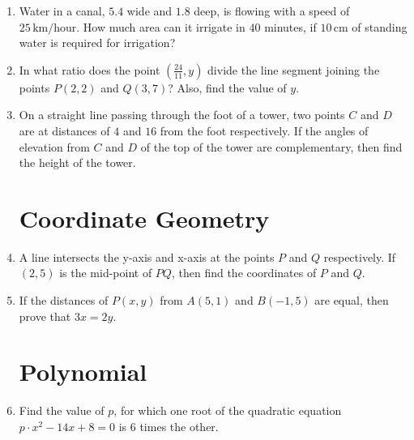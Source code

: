 \documentclass[12pt, letterpaper]{article}
\begin{document}
\begin{enumerate}
    \item Water in a canal, $5.4$ wide and $1.8$ deep, is flowing with a speed of $25\,\text{km/hour}$. How much area can it irrigate in $40$ minutes, if $10\,\text{cm}$ of standing water is required for irrigation?
    \item In what ratio does the point $ \left(\frac{24}{11}, y \right) $ divide the line segment joining the points $P(2, 2)$ and $Q(3, 7)$? Also, find the value of $y$.
    \item On a straight line passing through the foot of a tower, two points $C$ and $D$ are at distances of $4$ and $16$ from the foot respectively. If the angles of elevation from $C$ and $D$ of the top of the tower are complementary, then find the height of the tower.

    \section*{Coordinate Geometry}
    \item A line intersects the y-axis and x-axis at the points $P$ and $Q$ respectively. If $(2,5)$ is the mid-point of $PQ$, then find the coordinates of $P$ and $Q$.
    \item If the distances of $P(x, y)$ from $A(5, 1)$ and $B(-1, 5)$ are equal, then prove that $3x = 2y$.

    \section*{Polynomial}
    \item Find the value of $p$, for which one root of the quadratic equation $p \cdot x^2 - 14x + 8 = 0$ is 6 times the other.
\end{enumerate}
\end{document}
